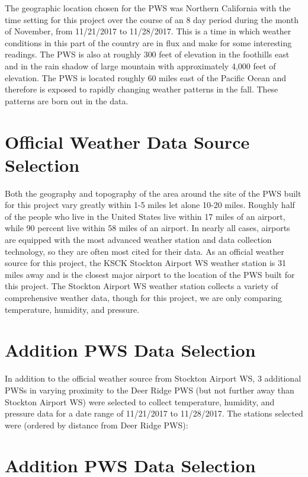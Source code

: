 \documentclass[sigconf]{acmart}
\begin{document}
The geographic location chosen for the PWS was Northern California with the time setting for this project over the course of an 8 day period during the month of November, from 11/21/2017 to 11/28/2017. This is a time in which weather conditions in this part of the country are in flux and make for some interesting readings. The PWS is also at roughly 300 feet of elevation in the foothills east and in the rain shadow of large mountain with approximately 4,000 feet of elevation. The PWS is located roughly 60 miles east of the Pacific Ocean and therefore is exposed to rapidly changing weather patterns in the fall. These patterns are born out in the data.

\section{Official Weather Data Source Selection}

Both the geography and topography of the area around the site of the PWS built for this project vary greatly within 1-5 miles let alone 10-20 miles. Roughly half of the people who live in the United States live within 17 miles of an airport, while 90 percent live within 58 miles of an airport.\cite{Pearson2017} In nearly all cases, airports are equipped with the most advanced weather station and data collection technology, so they are often most cited for their data. As an official weather source for this project, the KSCK Stockton Airport WS weather station is 31 miles away and is the closest major airport to the location of the PWS built for this project. The Stockton Airport WS weather station collects a variety of comprehensive weather data, though for this project, we are only comparing temperature, humidity, and pressure. 


\section{Addition PWS Data Selection}

In addition to the official weather source from Stockton Airport WS, 3 additional PWSs in varying proximity to the Deer Ridge PWS (but not further away than Stockton Airport WS) were selected to collect temperature, humidity, and pressure data for a date range of 11/21/2017 to 11/28/2017. The stations selected were (ordered by distance from Deer Ridge PWS):

\section{Addition PWS Data Selection} 
\end{document}
